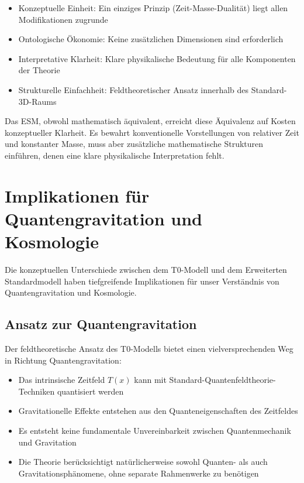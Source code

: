 \documentclass[12pt,a4paper]{article}
\newcommand{\Tfield}{T(x)}
\begin{document}
	\begin{itemize}
		\item Konzeptuelle Einheit: Ein einziges Prinzip (Zeit-Masse-Dualität) liegt allen Modifikationen zugrunde
		\item Ontologische Ökonomie: Keine zusätzlichen Dimensionen sind erforderlich
		\item Interpretative Klarheit: Klare physikalische Bedeutung für alle Komponenten der Theorie
		\item Strukturelle Einfachheit: Feldtheoretischer Ansatz innerhalb des Standard-3D-Raums
	\end{itemize}
	
	Das ESM, obwohl mathematisch äquivalent, erreicht diese Äquivalenz auf Kosten konzeptueller Klarheit. Es bewahrt konventionelle Vorstellungen von relativer Zeit und konstanter Masse, muss aber zusätzliche mathematische Strukturen einführen, denen eine klare physikalische Interpretation fehlt.
	
	\section{Implikationen für Quantengravitation und Kosmologie}
	\label{sec:implications}
	
	Die konzeptuellen Unterschiede zwischen dem T0-Modell und dem Erweiterten Standardmodell haben tiefgreifende Implikationen für unser Verständnis von Quantengravitation und Kosmologie.
	
	\subsection{Ansatz zur Quantengravitation}
	\label{subsec:quantum_gravity}
	
	Der feldtheoretische Ansatz des T0-Modells bietet einen vielversprechenden Weg in Richtung Quantengravitation:
	
	\begin{itemize}
		\item Das intrinsische Zeitfeld \(\Tfield\) kann mit Standard-Quantenfeldtheorie-Techniken quantisiert werden
		\item Gravitationelle Effekte entstehen aus den Quanteneigenschaften des Zeitfeldes
		\item Es entsteht keine fundamentale Unvereinbarkeit zwischen Quantenmechanik und Gravitation
		\item Die Theorie berücksichtigt natürlicherweise sowohl Quanten- als auch Gravitationsphänomene, ohne separate Rahmenwerke zu benötigen
	\end{itemize}
	
\end{document}
